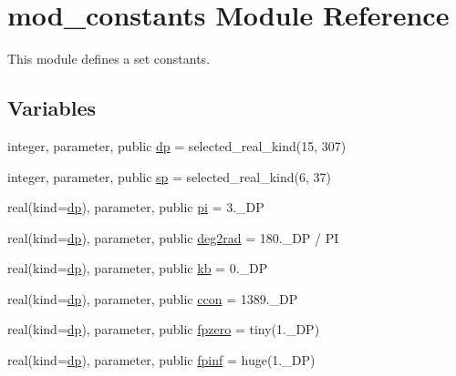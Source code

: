 \hypertarget{namespacemod__constants}{}\section{mod\+\_\+constants Module Reference}
\label{namespacemod__constants}


This module defines a set constants.  


\subsection*{Variables}
\begin{DoxyCompactItemize}
\item 
integer, parameter, public \hyperlink{namespacemod__constants_ac7aeda7f1802c4ef2a4780773c028214}{dp} = selected\+\_\+real\+\_\+kind(15, 307)
\item 
integer, parameter, public \hyperlink{namespacemod__constants_af0d7aefb6fb852492ee0db77744a412d}{sp} = selected\+\_\+real\+\_\+kind(6, 37)
\item 
real(kind=\hyperlink{namespacemod__constants_ac7aeda7f1802c4ef2a4780773c028214}{dp}), parameter, public \hyperlink{namespacemod__constants_a04c6845722711f5522458ed34969cdc3}{pi} = 3.\+\_\+\+DP
\item 
real(kind=\hyperlink{namespacemod__constants_ac7aeda7f1802c4ef2a4780773c028214}{dp}), parameter, public \hyperlink{namespacemod__constants_a505a7c2ab1e1b2fa75db18a1d3e133b4}{deg2rad} = 180.\+\_\+\+D\+P / PI
\item 
real(kind=\hyperlink{namespacemod__constants_ac7aeda7f1802c4ef2a4780773c028214}{dp}), parameter, public \hyperlink{namespacemod__constants_af84a9ff68ff16d57560ea196b8e560d4}{kb} = 0.\+\_\+\+DP
\item 
real(kind=\hyperlink{namespacemod__constants_ac7aeda7f1802c4ef2a4780773c028214}{dp}), parameter, public \hyperlink{namespacemod__constants_a0943b8c8fb52658fb3d4370e5defb34b}{ccon} = 1389.\+\_\+\+DP
\item 
real(kind=\hyperlink{namespacemod__constants_ac7aeda7f1802c4ef2a4780773c028214}{dp}), parameter, public \hyperlink{namespacemod__constants_a1f06c759fc8a61d66f343865300c37d1}{fpzero} = tiny(1.\+\_\+\+D\+P)
\item 
real(kind=\hyperlink{namespacemod__constants_ac7aeda7f1802c4ef2a4780773c028214}{dp}), parameter, public \hyperlink{namespacemod__constants_a64820d61363b4adcee8f4f810662e836}{fpinf} = huge(1.\+\_\+\+D\+P)
\item 

\end{DoxyCompactItemize}
